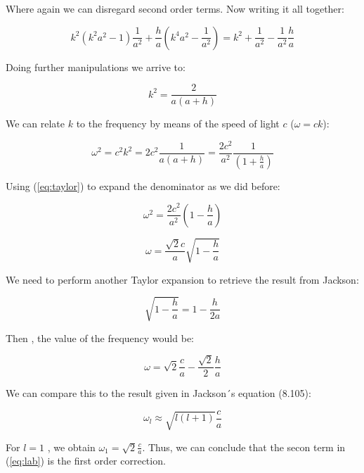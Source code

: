 \documentclass[a4paper,12pt]{article}
\begin{document}
Where again we can disregard second order terms. Now writing it all together: 

\begin{equation}
k^2(k^2a^2-1) \frac{1}{a^2} + \frac{h}{a} \left(k^4a^2 - \frac{1}{a^2} \right) = k^2 + \frac{1}{a^2} - \frac{1}{a^2} \frac{h}{a}	
\end{equation}

Doing further manipulations we arrive to:

\begin{equation}
k^2 = \frac{2}{a(a+h)}
\end{equation}

We can relate $k$ to the frequency by means of the speed of light $c$ ($\omega = ck$): 

\begin{equation}
\omega ^2 = c^2 k^2 = 2c^2 \frac{1}{a(a+h)} = \frac{2 c^2}{a^2} \frac{1}{(1+\frac{h}{a})}
\end{equation}

Using (\ref{eq:taylor}) to expand the denominator as we did before: 

\begin{equation}
\omega^2 = \frac{2c^2}{a^2} (1 - \frac{h}{a})
\end{equation}

\begin{equation}
\omega = \frac{\sqrt{2} c}{a} \sqrt{1 - \frac{h}{a}}
\end{equation} 	

We need to perform another Taylor expansion to retrieve the result from Jackson: 

\begin{equation}
\sqrt{1 - \frac{h}{a}} = 1 - \frac{h}{2a}
\end{equation}

Then , the value of the frequency would be: 

\begin{equation} 
\omega = \sqrt{2} \frac{c}{a} - \frac{\sqrt{2}}{2} \frac{h}{a}
\label{eq:lab}
\end{equation}

We can compare this to the result given in Jackson´s equation (8.105): 

\begin{equation} 
\omega_l \approx   \sqrt{l (l+1)} \frac{c}{a}
\end{equation}

For $l=1$ , we obtain $\omega_1 = \sqrt{2} \frac{c}{a}$. Thus, we can conclude that the secon term in (\ref{eq:lab}) is the first order correction.
\end{document}
